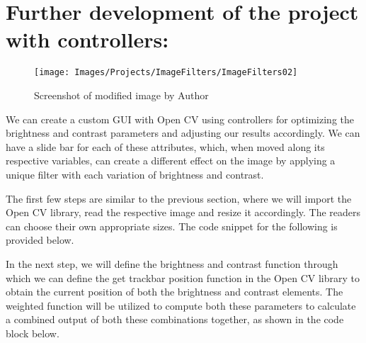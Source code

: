 \section{Further development of the project with controllers:}

\begin{figure}
    \texttt{[image: Images/Projects/ImageFilters/ImageFilters02]}
    \caption{Screenshot of modified image by Author} \label{ImageFilters02}
\end{figure}


We can create a custom GUI with Open CV using controllers for optimizing the brightness and contrast parameters and adjusting our results accordingly. We can have a slide bar for each of these attributes, which, when moved along its respective variables, can create a different effect on the image by applying a unique filter with each variation of brightness and contrast.

The first few steps are similar to the previous section, where we will import the Open CV library, read the respective image and resize it accordingly. The readers can choose their own appropriate sizes. The code snippet for the following is provided below.

\medskip



\PYTHON{}




\medskip

In the next step, we will define the brightness and contrast function through which we can define the get trackbar position function in the Open CV library to obtain the current position of both the brightness and contrast elements. The weighted function will be utilized to compute both these parameters to calculate a combined output of both these combinations together, as shown in the code block below.

\medskip




